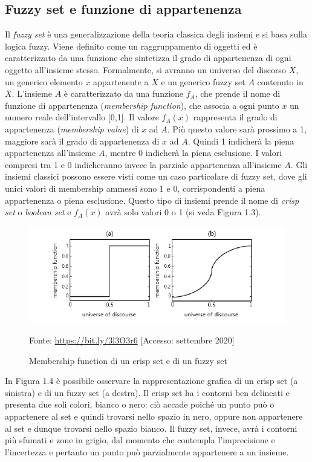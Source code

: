 \documentclass[11pt,  oneside, openany]{book}
\newcommand{\source}[1]{\caption*{Fonte: {#1}} }
\begin{document}
\subsection{Fuzzy set e funzione di appartenenza}
Il \textit{fuzzy set} è una generalizzazione della teoria classica degli insiemi e si basa sulla logica fuzzy. Viene definito come un raggruppamento di oggetti ed è caratterizzato da una funzione che sintetizza il grado di appartenenza di ogni oggetto all'insieme stesso. Formalmente, si avranno un universo del discorso $X$, un generico elemento $x$  appartenente a $X$ e un generico fuzzy set $A$ contenuto in $X$. L'insieme $A$ è caratterizzato da una funzione $f_A$, che prende il nome di funzione di appartenenza (\textit{membership function}), che associa a ogni punto $x$ un numero reale dell'intervallo [0,1]. Il valore $f_A(x)$ rappresenta il grado di appartenenza (\textit {membership value}) di $x$ ad $A$. Più questo valore sarà prossimo a 1, maggiore sarà il grado di appartenenza di $x$ ad $A$. Quindi 1 indicherà la piena appartenenza all'insieme $A$, mentre 0 indicherà la piena esclusione. I valori compresi tra 1 e 0 indicheranno invece la parziale appartenenza all'insieme $A$. Gli insiemi classici possono essere visti come un caso particolare di fuzzy set, dove gli unici valori di membership ammessi sono 1 e 0, corrispondenti a piena appartenenza o piena esclusione. Questo tipo di insiemi prende il nome di \textit{crisp set} o \textit{boolean set} e $f_A(x)$ avrà solo valori 0 o 1 (si veda Figura 1.3). 


\begin{figure}[h!]
\begin{center}
  \includegraphics[width=13cm]{Immagini/membfunctcrispvsfuzzy.png}\\
  \caption{Membership function di un crisp set e di un fuzzy set}
  \source{\url{https://bit.ly/3l3O3r6} [Accesso: settembre 2020]}
\end{center}
\end{figure}

In Figura 1.4 è possibile osservare la rappresentazione grafica di un crisp set (a sinistra) e di un fuzzy set (a destra). Il crisp set ha i contorni ben delineati e presenta due soli colori, bianco o nero: ciò accade poiché un punto può o appartenere al set e quindi trovarsi nello spazio in nero, oppure non appartenere al set e dunque trovarsi nello spazio bianco. Il fuzzy set, invece, avrà i contorni più sfumati e zone in grigio, dal momento che contempla l'imprecisione e l'incertezza e pertanto un punto può parzialmente appartenere a un insieme. 
\end{document}
